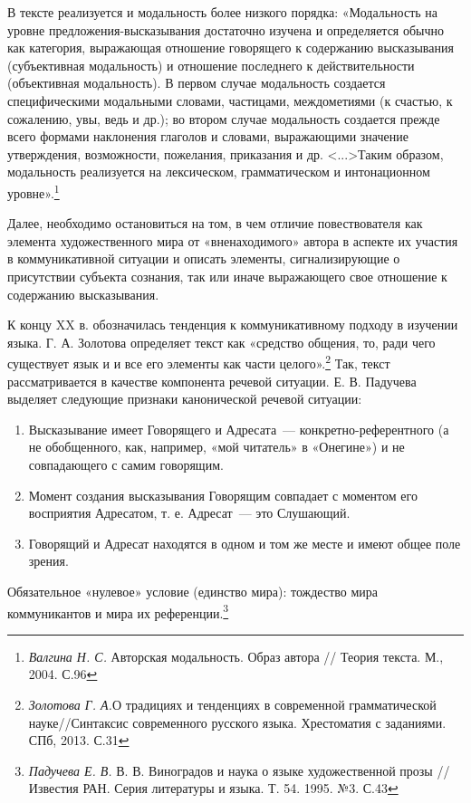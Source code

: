 \documentclass{kursa4}
\begin{document}
{      В тексте реализуется и модальность более низкого порядка: «Модальность на уровне предложения-высказывания достаточно изучена и определяется обычно как категория, выражающая отношение говорящего к содержанию высказывания (субъективная модальность) и отношение последнего к действительности (объективная модальность). В первом случае модальность создается специфическими модальными словами, частицами, междометиями (к счастью, к сожалению, увы, ведь и др.); во втором случае модальность создается прежде всего формами наклонения глаголов и словами, выражающими значение утверждения, возможности, пожелания, приказания и др. \textless{}...\textgreater{}Таким образом, модальность реализуется на лексическом, грамматическом и интонационном уровне».\footnote{\textit{{Валгина Н. С. }}{Авторская модальность. Образ автора // Теория текста. М., 2004. С.96}} 

      Далее, необходимо остановиться на том, в чем отличие повествователя как элемента художественного мира от «вненаходимого» автора в аспекте их участия в коммуникативной ситуации и описать элементы, сигнализирующие о присутствии субъекта сознания, так или иначе выражающего свое отношение к содержанию высказывания. 

      К концу XX в. обозначилась тенденция к коммуникативному подходу в изучении языка. Г. А. Золотова определяет текст как «средство общения, то, ради чего существует язык и и все его элементы как части целого».\footnote{\textit{Золотова Г. А.}О традициях и тенденциях в современной грамматической науке//Синтаксис современного русского языка. Хрестоматия с заданиями. СПб, 2013. С.31} Так, текст рассматривается в качестве компонента речевой ситуации. \newline
      Е. В. Падучева выделяет следующие признаки канонической речевой ситуации: 

      \begin{enumerate}
      \item Высказывание имеет Говорящего и Адресата~--- конкретно-референтного (а не обобщенного, как, например, «мой читатель» в «Онегине») и не совпадающего с самим говорящим. 
      \item Момент создания высказывания Говорящим совпадает с моментом его восприятия Адресатом, т. е. Адресат~--- это Слушающий. 
      \item Говорящий и Адресат находятся в одном и том же месте и имеют общее поле зрения. 
      \end{enumerate}
      Обязательное «нулевое» условие (единство мира): тождество мира коммуникантов и мира их референции.\footnote{\textit{Падучева Е. В. }В. В. Виноградов и наука о языке художественной прозы // Известия РАН. Серия литературы и языка. Т. 54. 1995. №3. С.43} 

}
\end{document}
